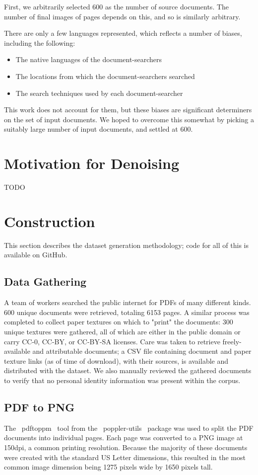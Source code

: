 \documentclass[runningheads]{llncs}
\begin{document}
First, we arbitrarily selected 600 as the number of source documents. The number of final images of pages depends on this, and so is similarly arbitrary.

There are only a few languages represented, which reflects a number of biases, including the following:
\begin{itemize}
\item The native languages of the document-searchers
\item The locations from which the document-searchers searched
\item The search techniques used by each document-searcher
\end{itemize}

This work does not account for them, but these biases are significant determiners on the set of input documents. We hoped to overcome this somewhat by picking a suitably large number of input documents, and settled at 600.

\section{Motivation for Denoising}
TODO

\section{Construction}
This section describes the dataset generation methodology; code for all of this is available on GitHub.

\subsection{Data Gathering}
A team of workers searched the public internet for PDFs of many different kinds. 600 unique documents were retrieved, totaling 6153 pages. A similar process was completed to collect paper textures on which to "print" the documents: 300 unique textures were gathered, all of which are either in the public domain or carry CC-0, CC-BY, or CC-BY-SA licenses. Care was taken to retrieve freely-available and attributable documents; a CSV file containing document and paper texture links (as of time of download), with their sources, is available and distributed with the dataset. We also manually reviewed the gathered documents to verify that no personal identity information was present within the corpus.

\subsection{PDF to PNG}
The ~pdftoppm~ tool from the ~poppler-utils~ package was used to split the PDF documents into individual pages. Each page was converted to a PNG image at 150dpi, a common printing resolution. Because the majority of these documents were created with the standard US Letter dimensions, this resulted in the most common image dimension being 1275 pixels wide by 1650 pixels tall.
\end{document}
